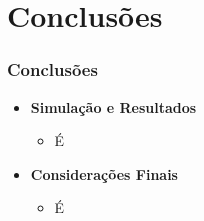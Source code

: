 \documentclass[xcolor=dvipsnames, aspectratio=169]{beamer}
\begin{document}
  

\section{Conclusões}
\begin{frame}
  \frametitle{Conclusões}
  \begin{itemize}
    \item \textbf{Simulação e Resultados}
    \begin{itemize}
      \item É
    \end{itemize}
    \item \textbf{Considerações Finais}
    \begin{itemize}
      \item É
    \end{itemize}
  \end{itemize}
\end{frame}

\begin{frame}
    \printbibliography
\end{frame}


\begin{frame}
\titlepage %
\end{frame}
\end{document}
